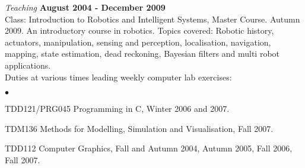 \documentclass[a4paper,margin,line]{res} \usepackage{latexsym}
\newenvironment{list2}{
  \begin{list}{$\bullet$}{%
      \setlength{\itemsep}{0in} \setlength{\parsep}{0in}
      \setlength{\parskip}{0in} \setlength{\topsep}{0in}
      \setlength{\partopsep}{0in}
      \setlength{\leftmargin}{0.2in}}}{\end{list}}
\begin{document}
\begin{resume}

{\em Teaching} \hfill {\bf August 2004 - December
  2009}\\ Class: Introduction to Robotics and Intelligent Systems, Master
Course. Autumn 2009. An introductory course in robotics. Topics
covered: Robotic history, actuators, manipulation, sensing and
perception, localisation, navigation, mapping, state estimation, dead
reckoning, Bayesian filters and multi robot applications.
\\ Duties at various times leading weekly computer lab exercises:

\vspace*{.05in}
\begin{list2}
\item TDD121/PRG045 Programming in C, Winter 2006 and 2007.
\item TDM136 Methods for Modelling, Simulation and Visualisation, Fall
  2007.
\item TDD112 Computer Graphics, Fall and Autumn 2004, Autumn 2005,
  Fall 2006, Fall 2007.
\end{list2}







\end{resume}
\end{document}
